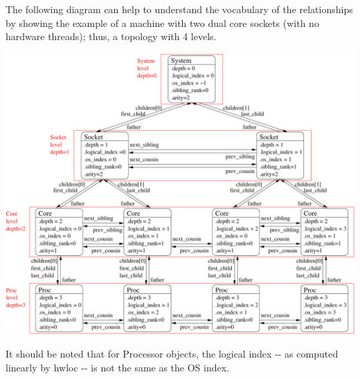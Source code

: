The following diagram can help to understand the vocabulary of the relationships by showing the example of a machine with two dual core sockets (with no hardware threads); thus, a topology with 4 levels.

 
\begin{DoxyImageNoCaption}
  \mbox{\includegraphics[width=\textwidth]{diagram}}
\end{DoxyImageNoCaption}


It should be noted that for Processor objects, the logical index -\/-\/ as computed linearly by hwloc -\/-\/ is not the same as the OS index. 
